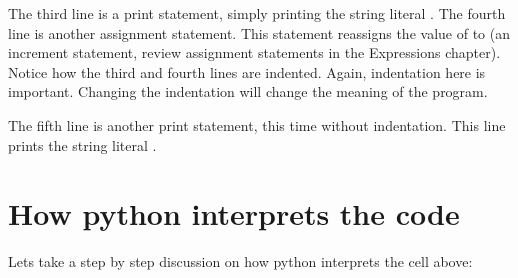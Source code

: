 \documentclass[letterpaper,10pt,english]{jupyterBook}
\begin{document}
\sphinxAtStartPar
The third line is a print statement, simply printing the string literal . The fourth line is another assignment statement. This statement reassigns the value of  to  (an increment statement, review assignment statements in the Expressions chapter). Notice how the third and fourth lines are indented. Again, indentation here is important. Changing the indentation will change the meaning of the program.

\sphinxAtStartPar
The fifth line is another print statement, this time without indentation. This line prints the string literal .


\section{How python interprets the code}
\label{\detokenize{loops:how-python-interprets-the-code}}
\sphinxAtStartPar
Lets take a step by step discussion on how python interprets the cell above:
\end{document}
